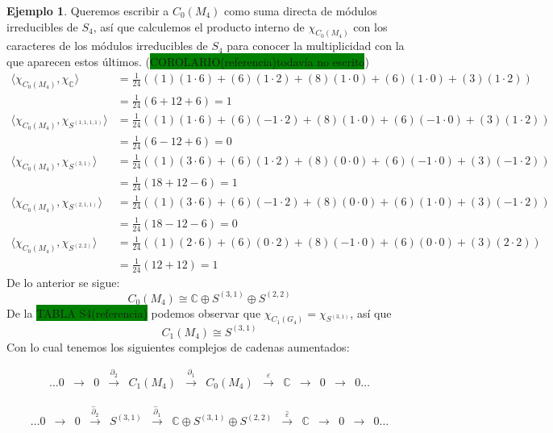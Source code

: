 \documentclass[12pt]{book}
\theoremstyle{definition}
\newtheorem{example}[theorem]{Ejemplo}
\newcounter{in}
\begin{document}
\begin{example}
Queremos escribir a $C_{0}(M_{4})$ como suma directa de módulos
irreducibles de $S_{4}$, así que calculemos el producto interno de $\chi_{C_{0}(M_{4})}$ con los
caracteres de los módulos irreducibles de $S_{4}$ para conocer la
multiplicidad con la que aparecen estos últimos.
(\setlength{\fboxsep}{0pt}\colorbox{green}{COROLARIO(referencia)todavía
no escrito})
\begin{align*}
  \langle\chi_{C_{0}(M_{4})},\chi_{\mathbb{C}}\rangle &=\frac{1}{24}((1)(1\cdot6)+(6)(1\cdot2)+(8)(1\cdot0)+(6)(1\cdot0)+(3)(1\cdot2))\\
  &=\frac{1}{24}(6+12+6)=1\\
  \langle\chi_{C_{0}(M_{4})},\chi_{S^{(1,1,1,1)}}\rangle &=\frac{1}{24}((1)(1\cdot6)+(6)(-1\cdot2)+(8)(1\cdot0)+(6)(-1\cdot0)+(3)(1\cdot2))\\
  &=\frac{1}{24}(6-12+6)=0\\
  \langle\chi_{C_{0}(M_{4})},\chi_{S^{(3,1)}}\rangle &=\frac{1}{24}((1)(3\cdot6)+(6)(1\cdot2)+(8)(0\cdot0)+(6)(-1\cdot0)+(3)(-1\cdot2))\\
  &=\frac{1}{24}(18+12-6)=1\\
  \langle\chi_{C_{0}(M_{4})},\chi_{S^{(2,1,1)}}\rangle &=\frac{1}{24}((1)(3\cdot6)+(6)(-1\cdot2)+(8)(0\cdot0)+(6)(1\cdot0)+(3)(-1\cdot2))\\
  &=\frac{1}{24}(18-12-6)=0\\
  \langle\chi_{C_{0}(M_{4})},\chi_{S^{(2,2)}}\rangle &=\frac{1}{24}((1)(2\cdot6)+(6)(0\cdot2)+(8)(-1\cdot0)+(6)(0\cdot0)+(3)(2\cdot2))\\
  &=\frac{1}{24}(12+12)=1
\end{align*}
De lo anterior se sigue:
$$C_{0}(M_{4})\cong \mathbb{C}\oplus S^{(3,1)}\oplus S^{(2,2)}$$
De la \setlength{\fboxsep}{0pt}\colorbox{green}{TABLA S4(referencia)}
podemos observar que $\chi_{C_{1}(G_{4})}=\chi_{S^{(3,1)}}$, así que  
$$C_{1}(M_{4})\cong S^{(3,1)}$$
Con lo cual tenemos los siguientes complejos de cadenas aumentados:

\begin{small}
    \[
    \begin{array}{ccccccccccccc}
      \dots 0 & \rightarrow & 0 &
      \stackrel{\partial_{2}}{\rightarrow} & C_{1}(M_{4}) &
      \stackrel{\partial_{1}}{\rightarrow} & C_{0}(M_{4}) & \stackrel{\varepsilon}{\rightarrow} &
      \mathbb{C} & \rightarrow  & 0 & \rightarrow & 0 \dots
    \end{array} 
    \]
  \end{small}
\begin{small}
    \[
    \begin{array}{ccccccccccccc}
      \dots 0 & \rightarrow & 0 &
      \stackrel{\widehat\partial_{2}}{\rightarrow} &  S^{(3,1)} &
      \stackrel{\widehat\partial_{1}}{\rightarrow} & \mathbb{C} \oplus
      S^{(3,1)}\oplus S^{(2,2)} & \stackrel{\widehat\varepsilon}{\rightarrow} &
      \mathbb{C} & \rightarrow  & 0 & \rightarrow & 0 \dots
    \end{array} 
    \]
  \end{small}


\end{example}
\end{document}
